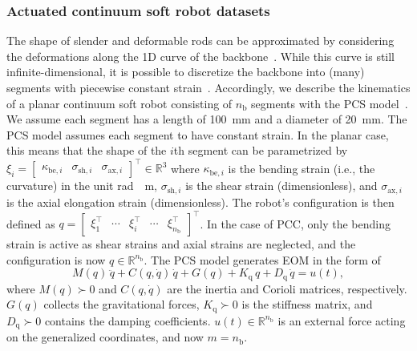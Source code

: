 \subsubsection{Actuated continuum soft robot datasets}\label{ssub:con:soft_robot_dataset}
The shape of slender and deformable rods can be approximated by considering the deformations along the 1D curve of the backbone~\citep{gazzola2018forward}. While this curve is still infinite-dimensional, it is possible to discretize the backbone into (many) segments with piecewise constant strain~\citep{renda2016discrete, gazzola2018forward}.
Accordingly, we describe the kinematics of a planar continuum soft robot consisting of $n_\mathrm{b}$ segments with the \gls{PCS} model~\citep{renda2016discrete}. We assume each segment has a length of \SI{100}{mm} and a diameter of \SI{20}{mm}.
The \gls{PCS} model assumes each segment to have constant strain. In the planar case, this means that the shape of the $i$th segment can be parametrized by $\xi_i = \begin{bmatrix}
    \kappa_{\mathrm{be},i} & \sigma_{\mathrm{sh},i} & \sigma_{\mathrm{ax},i}
\end{bmatrix}^\top \in \mathbb{R}^{3}$ where $\kappa_{\mathrm{be},i}$ is the bending strain (i.e., the curvature) in the unit \si{rad \per \meter}, $\sigma_{\mathrm{sh},i}$ is the shear strain  (dimensionless), and $\sigma_{\mathrm{ax},i}$ is the axial elongation strain (dimensionless).
The robot's configuration is then defined as $q = \begin{bmatrix}
    \xi_1^\top & \cdots & \xi_i^\top & \cdots & \xi_{n_\mathrm{b}}^\top
\end{bmatrix}^\top$.
In the case of \gls{PCC}, only the bending strain is active as shear strains and axial strains are neglected, and the configuration is now $q \in \mathbb{R}^{n_\mathrm{b}}$.
The \gls{PCS} model generates \gls{EOM} in the form of~\citep{della2023model}
\begin{equation}
    M(q) \, \ddot{q} + C(q,\dot{q}) \, \dot{q} + G(q) + K_\mathrm{q} \, q + D_\mathrm{q} \, \dot{q} = u(t),
\end{equation}
where $M(q) \succ 0$ and $C(q,\dot{q})$ are the inertia and Corioli matrices, respectively. $G(q)$ collects the gravitational forces, $K_\mathrm{q} \succ 0$ is the stiffness matrix, and $D_\mathrm{q} \succ 0$ contains the damping coefficients. 
$u(t) \in \mathbb{R}^{n_\mathrm{b}}$ is an external force acting on the generalized coordinates, and now $m = n_\mathrm{b}$.


